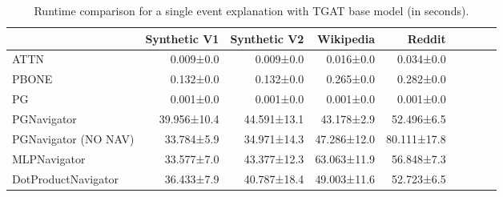 \begin{table}
\caption{Runtime comparison for a single event explanation with TGAT base model (in seconds).}
\label{tab:tgn_runtime_single}
\begin{tabular}{lrrrrrrrr}
\toprule
 & Synthetic V1 & Synthetic V2 & Wikipedia & Reddit \\
\midrule
ATTN & 0.009±0.0 & 0.009±0.0 & 0.016±0.0 & 0.034±0.0 \\
PBONE & 0.132±0.0 & 0.132±0.0 & 0.265±0.0 & 0.282±0.0 \\
PG & 0.001±0.0 & 0.001±0.0 & 0.001±0.0 & 0.001±0.0 \\
PGNavigator & 39.956±10.4 & 44.591±13.1 & 43.178±2.9 & 52.496±6.5 \\
PGNavigator (NO NAV) & 33.784±5.9 & 34.971±14.3 & 47.286±12.0 & 80.111±17.8 \\
MLPNavigator & 33.577±7.0 & 43.377±12.3 & 63.063±11.9 & 56.848±7.3 \\
DotProductNavigator & 36.433±7.9 & 40.787±18.4 & 49.003±11.6 & 52.723±6.5 \\
\bottomrule
\end{tabular}
\end{table}
